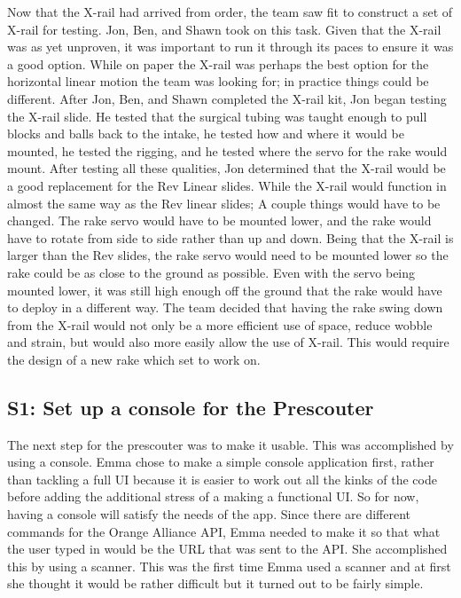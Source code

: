 \documentclass{article}
\begin{document}
Now that the X-rail had arrived from order, the team saw fit to construct a set of X-rail for testing. Jon, Ben, and Shawn took on this task. Given that the X-rail was as yet unproven, it was important to run it through its paces to ensure it was a good option. While on paper the X-rail was perhaps the best option for the horizontal linear motion the team was looking for; in practice things could be different. After Jon, Ben, and Shawn completed the X-rail kit, Jon began testing the X-rail slide. He tested that the surgical tubing was taught enough to pull blocks and balls back to the intake, he tested how and where it would be mounted, he tested the rigging, and he tested where the servo for the rake would mount. After testing all these qualities, Jon determined that the X-rail would be a good replacement for the Rev Linear slides. While the X-rail would function in almost the same way as the Rev linear slides; A couple things would have to be changed. The rake servo would have to be mounted lower, and the rake would have to rotate from side to side rather than up and down. Being that the X-rail is larger than the Rev slides, the rake servo would need to be mounted lower so the rake could be as close to the ground as possible. Even with the servo being mounted lower, it was still high enough off the ground that the rake would have to deploy in a different way. The team decided that having the rake swing down from the X-rail would not only be a more efficient use of space, reduce wobble and strain, but would also more easily allow the use of X-rail. This would require the design of a new rake which set to work on. 




\subsection{S1: Set up a console for the Prescouter}

The next step for the prescouter was to make it usable. This was accomplished by using a console. Emma chose to make a simple console application first, rather than tackling a full UI because it is easier to work out all the kinks of the code before adding the additional stress of a making a functional UI. So for now, having a console will satisfy the needs of the app. Since there are different commands for the Orange Alliance API, Emma needed to make it so that what the user typed in would be the URL that was sent to the API. She accomplished this by using a scanner. This was the first time Emma used a scanner and at first she thought it would be rather difficult but it turned out to be fairly simple. 
\end{document}

